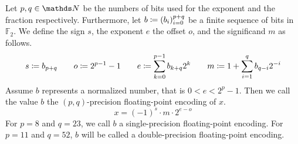 \documentclass{stdlocal}
\begin{document}
    \begin{definition}
      Let $p,q\in\setNatural$ be the numbers of bits used for the exponent and the fraction respectively.
      Furthermore, let $b\coloneqq (b_i)_{i=0}^{p+q}$ be a finite sequence of bits in $\mathds{F}_2$.
      We define the sign $s$, the exponent $e$ the offset $o$, and the significand $m$ as follows.
      \[
        s \coloneqq b_{p+q}
        \qquad
        o \coloneqq 2^{p-1} - 1
        \qquad
        e \coloneqq \sum_{k=0}^{p-1} b_{k+q} 2^{k}
        \qquad
        m \coloneqq 1 + \sum_{i=1}^{q} b_{q-i} 2^{-i}
      \]
      Assume $b$ represents a normalized number, that is $0 < e < 2^p - 1$.
      Then we call the value $b$ the $(p,q)$-precision floating-point encoding of $x$.
      \[
        x = (-1)^s \cdot m \cdot 2^{e-o}
      \]
      For $p=8$ and $q = 23$, we call $b$ a single-precision floating-point encoding.
      For $p=11$ and $q = 52$, $b$ will be called a double-precision floating-point encoding.
    \end{definition}
\end{document}
